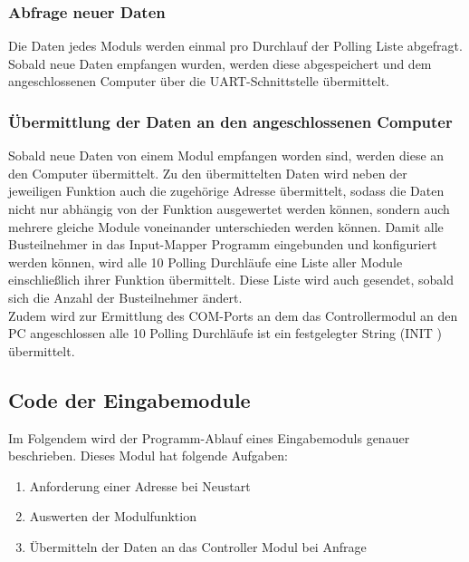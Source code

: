 \subsubsection{Abfrage neuer Daten}
Die Daten jedes Moduls werden einmal pro Durchlauf der Polling Liste abgefragt. Sobald neue Daten empfangen wurden, werden diese abgespeichert und dem angeschlossenen Computer über die UART-Schnittstelle übermittelt.\\



\subsubsection{Übermittlung der Daten an den angeschlossenen Computer}
Sobald neue Daten von einem Modul empfangen worden sind, werden diese an den Computer übermittelt. Zu den übermittelten Daten wird neben der jeweiligen Funktion auch die zugehörige Adresse übermittelt, sodass die Daten nicht nur abhängig von der Funktion ausgewertet werden können, sondern auch mehrere gleiche Module voneinander unterschieden werden können. Damit alle Busteilnehmer in das Input-Mapper Programm eingebunden und konfiguriert werden können, wird alle 10 Polling Durchläufe eine Liste aller Module einschließlich ihrer Funktion übermittelt. Diese Liste wird auch gesendet, sobald sich die Anzahl der Busteilnehmer ändert.\\
Zudem wird zur Ermittlung des COM-Ports an dem das Controllermodul an den PC angeschlossen alle 10 Polling Durchläufe ist ein festgelegter String (\glqq INIT
\grqq) übermittelt.


\subsection{Code der Eingabemodule}
\label{Code der Eingabemodule}
Im Folgendem wird der Programm-Ablauf eines Eingabemoduls genauer beschrieben. Dieses Modul hat folgende Aufgaben:
\begin{enumerate}
    \item Anforderung einer Adresse bei Neustart
    \item Auswerten der Modulfunktion
    \item Übermitteln der Daten an das Controller Modul bei Anfrage
\end{enumerate}

